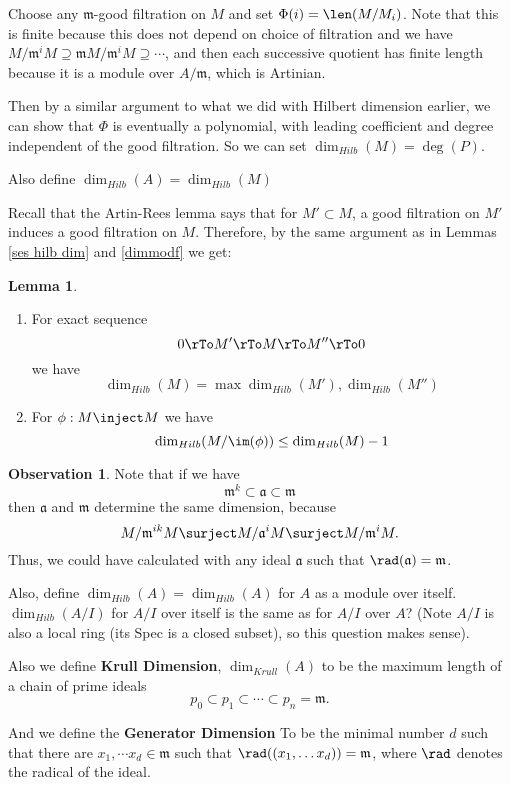 \documentclass[12 pt]{article}
\theoremstyle{definition}
\newtheorem{lemma}[theorem]{Lemma}
\newtheorem{obs}[theorem]{Observation}
\newcommand\fa{{\mathfrak a}}
\begin{document}
Choose any $\mathfrak{m}$-good filtration on $M$ and set $\Phi(i)=\len(M/M_i)$. Note that this is finite because this does not depend on choice of filtration and we have $M/\mathfrak{m}^iM \supseteq \mathfrak{m} M/\mathfrak{m}^iM \supseteq \cdots$, and then each successive quotient has finite length because it is a module over $A/\mathfrak{m}$, which is Artinian.

Then by a similar argument to what we did with Hilbert dimension earlier, we can show that $\Phi$ is eventually a polynomial, with leading coefficient and degree independent of the good filtration. So we can set $\dim_{Hilb}(M)=\deg(P)$.

Also define $\dim_{Hilb}(A)=\dim_{Hilb}(M)$


Recall that the Artin-Rees lemma says that for $M' \subset M$, a good filtration on $M'$ induces a good filtration on $M$. Therefore, by the same argument as in Lemmas \ref{ses hilb dim} and \ref{dimmodf} we get:
\begin{lemma}
\begin{enumerate}
\item For exact sequence
\[0 \rTo M' \rTo M \rTo M'' \rTo 0\]
we have
\[\dim_{Hilb}(M)=\max{\dim_{Hilb}(M'), \dim_{Hilb}(M'')}\]

\item For $\phi:M \inject M$ we have
\[\dim_{Hilb}(M/\im(\phi)) \leq \dim_{Hilb}(M)-1\]
\end{enumerate}
\label{local dim drop}
\end{lemma}


\begin{obs} Note that if we have
\[\mathfrak{m}^k \subset \fa \subset \mathfrak{m}\]
then $\fa$ and $\mathfrak{m}$ determine the same dimension, because
\[M/\mathfrak{m}^{ik}M \surject M/\fa^i M \surject M/\mathfrak{m}^i M.\]
Thus, we could have calculated with any ideal $\fa$ such that $\rad(\fa)=\mathfrak{m}$.
\end{obs}

Also, define $\dim_{Hilb}(A)=\dim_{Hilb}(A)$ for $A$ as a module over itself. $\dim_{Hilb}(A/I)$ for $A/I$ over itself is the same as for $A/I$ over $A$? (Note $A/I$ is also a local ring (its Spec is a closed subset), so this question makes sense).

Also we define \textbf{Krull Dimension}, $\dim_{Krull}(A)$ to be the maximum length of a chain of prime ideals
\[p_0 \subset p_1 \subset \cdots \subset p_n=\mathfrak{m}.\]

And we define the \textbf{Generator Dimension} To be the minimal number $d$ such that there are $x_1, \cdots x_d \in \mathfrak{m}$ such that $\rad((x_1, \ldots x_d))=\mathfrak{m}$, where $\rad$ denotes the radical of the ideal.
\end{document}
